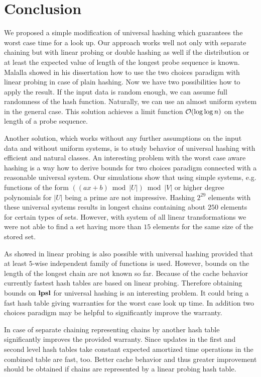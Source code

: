 \section{Conclusion}
\label{section-conclusion}
We proposed a simple modification of universal hashing which guarantees the worst case time for a look up. Our approach works well not only with separate chaining but with linear probing or double hashing as well if the distribution or at least the expected value of length of the longest probe sequence is known. Malalla showed in his dissertation \cite{Malalla:2004:THS:1124034} how to use the two choices paradigm with linear probing in case of plain hashing. Now we have two possibilities how to apply the result. If the input data is random enough, we can assume full randomness of the hash function. Naturally, we can use an almost uniform system in the general case. This solution achieves a limit function $\mathcal{O}(\log \log n)$ on the length of a probe sequence.

Another solution, which works without any further assumptions on the input data and without uniform systems, is to study behavior of universal hashing with efficient and natural classes. An interesting problem with the worst case aware hashing is a way how to derive bounds for two choices paradigm connected with a reasonable universal system. Our simulations show that using simple systems, e.g. functions of the form $((ax + b) \bmod |U|) \bmod |V|$ or higher degree polynomials for $|U|$ being a prime are not impressive. Hashing $2^{29}$ elements with these universal systems results in longest chains containing about $250$ elements for certain types of sets. However, with system of all linear transformations we were not able to find a set having more than $15$ elements for the same size of the stored set.

As showed in \cite{DBLP:conf/alenex/ThorupZ10} linear probing is also possible with universal hashing provided that at least $5$-wise independent family of functions is used. However, bounds on the length of the longest chain are not known so far. Because of the cache behavior currently fastest hash tables are based on linear probing. Therefore obtaining bounds on $\mathbf{lpsl}$ for universal hashing is an interesting problem. It could bring a fast hash table giving warranties for the worst case look up time. In addition two choices paradigm may be helpful to significantly improve the warranty.

In case of separate chaining representing chains by another hash table significantly improves the provided warranty. Since updates in the first and second level hash tables take constant expected amortized time operations in the combined table are fast, too. Better cache behavior and thus greater improvement should be obtained if chains are represented by a linear probing hash table.